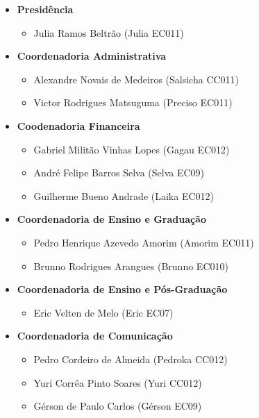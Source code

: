 \begin{itemize}
\item   \textbf{Presidência}
        \begin{itemize}
        \item Julia Ramos Beltrão (Julia EC011)
        \end{itemize}

\item   \textbf{Coordenadoria Administrativa}
        \begin{itemize}
        \item Alexandre Novais de Medeiros (Salsicha CC011)
        \item Victor Rodrigues Matsuguma (Preciso EC011)
        \end{itemize}

\item   \textbf{Coodenadoria Financeira}
        \begin{itemize}
        \item Gabriel Militão Vinhas Lopes (Gagau EC012)
        \item André Felipe Barros Selva (Selva EC09)
        \item Guilherme Bueno Andrade (Laika EC012)
        \end{itemize}

\item   \textbf{Coordenadoria de Ensino e Graduação}
        \begin{itemize}
        \item Pedro Henrique Azevedo Amorim (Amorim EC011)
        \item Brunno Rodrigues Arangues (Brunno EC010)
        \end{itemize}

\item   \textbf{Coordenadoria de Ensino e Pós-Graduação}
        \begin{itemize}
        \item Eric Velten de Melo (Eric EC07)
        \end{itemize}

\item   \textbf{Coordenadoria de Comunicação}
        \begin{itemize}
        \item Pedro Cordeiro de Almeida (Pedroka CC012)
        \item Yuri Corrêa Pinto Soares (Yuri CC012)
        \item Gérson de Paulo Carlos (Gérson EC09)
        \end{itemize}


\end{itemize}
